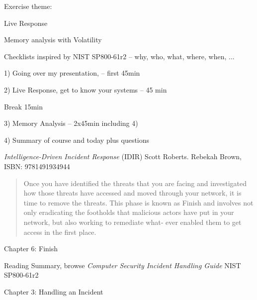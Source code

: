\documentclass[Screen16to9,17pt]{foils}
\begin{document}
Exercise theme:
\begin{list2}
\item Live Response
\item Memory analysis with Volatility
\item Checklists inspired by NIST SP800-61r2 -- why, who, what, where, when, ...
\end{list2}



\begin{list2}
\item 1) Going over my presentation,  -- first 45min
\item 2) Live Response, get to know your systems -- 45 min
\item Break 15min
\item 3) Memory Analysis -- 2x45min including 4)
\item 4) Summary of course and today plus questions
\end{list2}



\emph{Intelligence-Driven Incident Response} (IDIR)
 Scott Roberts. Rebekah Brown, ISBN: 9781491934944

\begin{quote}
Once you have identified the threats that you are facing and investigated how those
threats have accessed and moved through your network, it is time to remove the
threats. This phase is known as Finish and involves not only eradicating the footholds
that malicious actors have put in your network, but also working to remediate what‐
ever enabled them to get access in the first place.
\end{quote}

\begin{list2}
\item Chapter 6: Finish
\end{list2}

Reading Summary, browse \emph{Computer Security Incident Handling Guide} NIST SP800-61r2
\begin{list2}
\item  Chapter 3: Handling an Incident
\end{list2}



\end{document}
